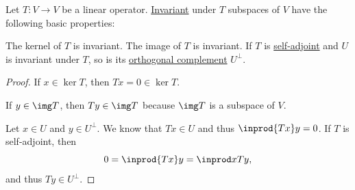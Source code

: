 \begin{proposition}\label{thm:invariant_subspace}
  Let \( T: V \to V \) be a linear operator. \hyperref[def:invariant_subset]{Invariant} under \( T \) subspaces of \( V \) have the following basic properties:
  \begin{thmenum}
     The kernel of \( T \) is invariant.
     The image of \( T \) is invariant.
     If \( T \) is \hyperref[def:adjoint_operator]{self-adjoint} and \( U \) is invariant under \( T \), so is its \hyperref[def:orthogonal_complement]{orthogonal complement} \( U^\perp \).
  \end{thmenum}
\end{proposition}
\begin{proof}
   If \( x \in \ker T \), then \( Tx = 0 \in \ker T \).

   If \( y \in \img T \), then \( Ty \in \img T \) because \( \img T \) is a subspace of \( V \).

   Let \( x \in U \) and \( y \in U^\perp \). We know that \( Tx \in U \) and thus \( \inprod {Tx} y = 0 \). If \( T \) is self-adjoint, then
  \begin{equation*}
    0 = \inprod {Tx} y = \inprod x {Ty},
  \end{equation*}
  and thus \( Ty \in U^\perp \).
\end{proof}


